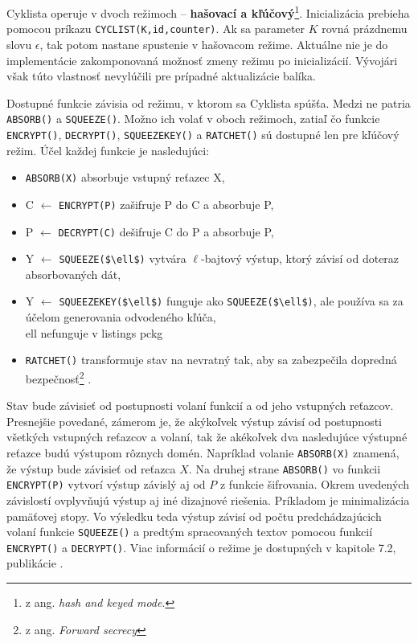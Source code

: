 Cyklista operuje v dvoch režimoch -- \textbf{hašovací a kľúčový}\footnote{z ang. \textit{hash and keyed mode}.}. 
Inicializácia prebieha pomocou príkazu \lstinline|CYCLIST(K,id,counter)|. Ak sa parameter $K$ rovná prázdnemu slovu $\epsilon$, tak potom nastane spustenie v hašovacom režime. Aktuálne nie je do implementácie zakomponovaná možnosť zmeny režimu po inicializácií. Vývojári však túto vlastnosť nevylúčili pre prípadné aktualizácie balíka.  


Dostupné funkcie závisia od režimu, v ktorom sa  Cyklista spúšťa. Medzi ne patria \lstinline|ABSORB()| a \lstinline|SQUEEZE()|. Možno ich volať v oboch režimoch, zatiaľ čo funkcie \lstinline|ENCRYPT()|, \lstinline|DECRYPT()|, \lstinline|SQUEEZEKEY()| a \lstinline|RATCHET()| sú dostupné len pre kľúčový režim. Účel každej funkcie je nasledujúci:
\begin{itemize}
	\item \lstinline|ABSORB(X)| absorbuje vstupný reťazec X,
	\item C $\gets$ \lstinline|ENCRYPT(P)| zašifruje P do C a absorbuje P,
	\item P $\gets$ \lstinline|DECRYPT(C)| dešifruje C do P a absorbuje P,
	\item Y $\gets$	\lstinline|SQUEEZE($\ell$)|  vytvára $\ell$-bajtový výstup, ktorý závisí od doteraz absorbovaných dát,
	\item Y $\gets$	\lstinline|SQUEEZEKEY($\ell$)| funguje ako \lstinline|SQUEEZE($\ell$)|, ale používa sa za účelom generovania odvodeného kľúča, 		\\ell nefunguje v listings pckg
	\item \lstinline|RATCHET()| transformuje stav na nevratný tak, aby sa zabezpečila dopredná bezpečnosť\footnote{z ang. \textit{Forward secrecy}} \cite{fsec}. 
\end{itemize}

Stav bude závisieť od postupnosti volaní funkcií a od jeho vstupných reťazcov. Presnejšie povedané, zámerom je, že akýkoľvek výstup závisí od postupnosti všetkých vstupných reťazcov a volaní, tak že akékoľvek dva nasledujúce výstupné reťazce budú výstupom rôznych domén. Napríklad volanie \lstinline|ABSORB(X)| znamená, že výstup bude závisieť od reťazca $X$. Na druhej strane \lstinline|ABSORB()| vo funkcii \lstinline|ENCRYPT(P)| vytvorí výstup závislý aj od $P$ z funkcie šifrovania. Okrem uvedených závislostí ovplyvňujú výstup aj iné dizajnové riešenia. Príkladom je minimalizácia pamäťovej stopy. Vo výsledku teda výstup závisí od počtu predchádzajúcich volaní funkcie \lstinline|SQUEEZE()| a predtým spracovaných textov pomocou funkcií \lstinline|ENCRYPT()| a \lstinline|DECRYPT()|. Viac informácií o režime je dostupných v kapitole 7.2, publikácie \cite{xcb}. 


